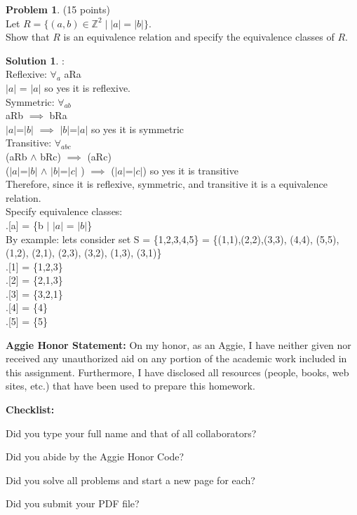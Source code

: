 \documentclass{article}
\theoremstyle{definition}
\newtheorem{problem}{Problem}
\newtheorem*{solution}{Solution}
\newcommand{\honor}{\noindent \textbf{Aggie Honor Statement: }On my honor, as an Aggie, I have neither
  given nor received any unauthorized aid on any portion of the
  academic work included in this assignment. Furthermore, I have
  disclosed all resources (people, books, web sites, etc.) that have
  been used to prepare this homework. 
}
\newcommand{\checklist}{\noindent\textbf{Checklist:}
\begin{compactenum}
\item Did you type your full name and that of all collaborators? 
\item Did you abide by the Aggie Honor Code?
\item Did you solve all problems and start a new page for each? 
\item Did you submit your  PDF file?
\end{compactenum}
}
\begin{document}
\newpage

\begin{problem} (15 points)\\
Let $R =\{(a,b) \in \mathbb{Z}^2 \mid |a| = |b|\}$. \\
Show that $R$ is an equivalence relation and specify the equivalence classes of $R$.
\end{problem}
\begin{solution} : \\

Reflexive: $\forall$$_a$ aRa \\
$|a|$ = $|a|$ so yes it is reflexive.\\

Symmetric: $\forall$$_{ab}$ \\
aRb $\implies$ bRa \\
$|a|$=$|b|$ $\implies$ $|b|$=$|a|$ so yes it is symmetric\\

Transitive:  $\forall$$_{abc}$ \\
(aRb $\wedge$ bRc) $\implies$ (aRc) \\
($|a|$=$|b|$ $\wedge$ $|b|$=$|c|$ ) $\implies$ ($|a|$=$|c|$) so yes it is transitive
\\

Therefore, since it is reflexive, symmetric, and transitive it is a equivalence relation.
\\

Specify equivalence classes:
\\
.[a] = \{b $|$ $|a|$ = $|b|$\}
\\
By example: lets consider set S = \{1,2,3,4,5\} = \{(1,1),(2,2),(3,3), (4,4), (5,5), (1,2), (2,1), (2,3), (3,2), (1,3), (3,1)\} \\

.[1] = \{1,2,3\} \\
.[2] = \{2,1,3\} \\
.[3] = \{3,2,1\} \\
.[4] = \{4\} \\
.[5] = \{5\} \\
\end{solution}

\newpage


\goodbreak
\honor

\bigskip
\checklist
\end{document}
